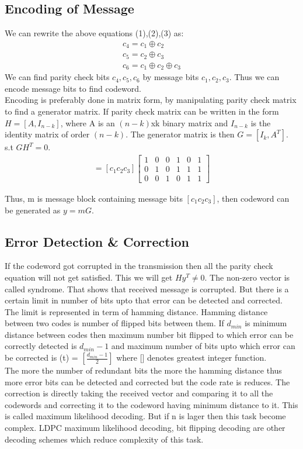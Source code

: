 \documentclass[twopage,12pt,a4paper]{report}
\begin{document}
\begin{raggedright}
\subsection{Encoding of Message}
We can rewrite the above equations (1),(2),(3) as:
\begin{align}
c_4 = c_1 \oplus c_2 \\
c_5 = c_2 \oplus c_3 \\
c_6 = c_1 \oplus c_2 \oplus c_3  
\end{align}  
We can find parity check bits $c_4,c_5,c_6$ by message bits $c_1,c_2,c_3$.
Thus we can encode message bits to find codeword. \\
Encoding is preferably done in matrix form, by manipulating parity check matrix to find a generator matrix.
If parity check matrix can be written in the form
$H = [A, I_{n- k} ]$,
where A is an $(n-k)$xk binary matrix and $I_{n-k}$ is the identity matrix of order
$(n-k)$. The generator matrix is then
$G = [I_k , A^T ]$.
s.t $GH^T = 0$. \\
\begin{align}
[c_1 c_2 ... c_6]=[c_1 c_2 c_3] \left[ \begin{array}{cccccc}
1 & 0 & 0 & 1 & 0 & 1\\
0 & 1 & 0 & 1 & 1 & 1\\
0 & 0 & 1 & 0 & 1 & 1  
\end{array} \right]
\end{align}
 

Thus, m is message block containing message bits $[c_1 c_2 c_3]$, then codeword can be generated as $y=mG$.

\subsection{Error Detection \& Correction}

If the codeword got corrupted in the transmission then all the parity check equation will not get satisfied. This we will get $Hy^T\neq0$. The non-zero vector is called syndrome. That shows that received message is corrupted. But there is a certain limit in number of bits upto that error can be detected and corrected.
The limit is represented in term of hamming distance. Hamming distance between two codes is number of flipped bits between them. If $d_{min}$ is minimum distance between codes then maximum number bit flipped to which error can be correctly detected is $d_{min}-1$ and maximum number of bits upto which error can be corrected is
(t) = $[\frac{d_{min}-1}{2}]$
where [] denotes greatest integer function.\\
The more the number of redundant bits the more the hamming distance thus more error bits can be detected and corrected but the code rate is reduces. The correction is directly taking the received vector and comparing it to all the codewords and correcting it to the codeword having minimum distance to it. This is called maximum likelihood decoding. But if n is lager then this task become complex. LDPC maximum likelihood decoding, bit flipping decoding are other decoding schemes which reduce complexity of this task.



\end{raggedright}
\end{document}
